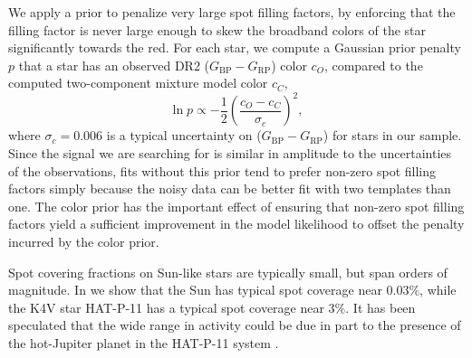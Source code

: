 We apply a prior to penalize very large spot filling factors, by enforcing that the filling factor is never large enough to skew the broadband colors of the star significantly towards the red. For each star, we compute a Gaussian prior penalty $p$ that a star has an observed \gaia DR2 ($G_\mathrm{BP}-G_\mathrm{RP}$) color $c_O$, compared to the computed two-component mixture model color $c_C$, 
\begin{equation}
\ln p \propto -\frac{1}{2}\left( \frac{c_O - c_C}{\sigma_c} \right)^2,
\end{equation}
where $\sigma_c = 0.006$ is a typical uncertainty on ($G_\mathrm{BP}-G_\mathrm{RP}$) for stars in our sample. Since the signal we are searching for is similar in amplitude to the uncertainties of the observations, fits without this prior tend to prefer non-zero spot filling factors simply because the noisy data can be better fit with two templates than one. The color prior has the important effect of ensuring that non-zero spot filling factors yield a sufficient improvement in the model likelihood to offset the penalty incurred by the color prior.


Spot covering fractions on Sun-like stars are typically small, but span orders of magnitude. In \citet{Morris2017a} we show that the Sun has typical spot coverage near 0.03\%, while the K4V star HAT-P-11 has a typical spot coverage near 3\%.
It has been speculated that the wide range in activity 
could be due in part to the presence of the hot-Jupiter planet in the HAT-P-11 system \citep{Morris2017b}.


